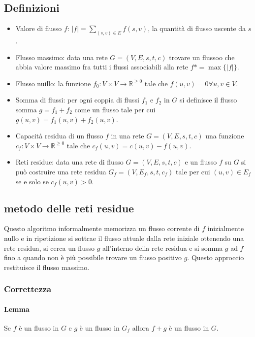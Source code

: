\subsection{Definizioni}
\begin{itemize}
	\item Valore di flusso $f$: $|f| = \sum\limits_{(s, v)\in E} f(s, v)$, la quantit\`a di flusso uscente da $s$.
	\item Flusso massimo: data una rete $G=(V, E, s, t, c)$ trovare un flussoo che abbia valore massimo fra tutti i flussi associabili alla rete $f*=\max\{|f|\}$.
	\item Flusso nuillo: la funzione $f_0: V\times V\rightarrow\mathbb{R}^{\ge 0}$ tale che $f(u, v) = 0 \forall u, v\in V$.
	\item Somma di flussi: per ogni coppia di flussi $f_1$ e $f_2$ in $G$ si definisce il flusso somma $g= f_1+f_2$ come un flusso tale per cui $g(u, v) = f_1(u, v)+f_2(u, v)$.
	\item Capacit\`a residua di un flusso $f$ in una rete $G=(V, E, s, t, c)$ una funzione $c_f:V\times V\rightarrow\mathbb{R}^{\ge 0}$ tale che $c_f(u, v) = c(u, v)-f(u, v)$.
	\item Reti residue: data una rete di flusso $G=(V, E, s, t, c)$ e un flusso $f$ su $G$ si pu\`o costruire una rete residua $G_f=(V, E_f, s, t, c_f)$ tale per cui $(u, v)\in E_f$
		se e solo se $c_f(u, v)>0$.
\end{itemize}
\subsection{metodo delle reti residue}
Questo algoritmo informalmente memorizza un flusso corrente di $f$ inizialmente nullo e in ripetizione si sottrae il flusso attuale dalla rete iniziale ottenendo una rete residua, 
si cerca un flusso $g$ all'interno della rete residua e si somma $g$ ad $f$ fino a quando non \`e pi\`u possibile trovare un flusso positivo $g$. Questo approccio restituisce il flusso
massimo.\\

\subsubsection{Correttezza}
\paragraph{Lemma}
Se $f$ \`e un flusso in $G$ e $g$ \`e un flusso in $G_f$ allora $f+g$ \`e un flusso in $G$.
